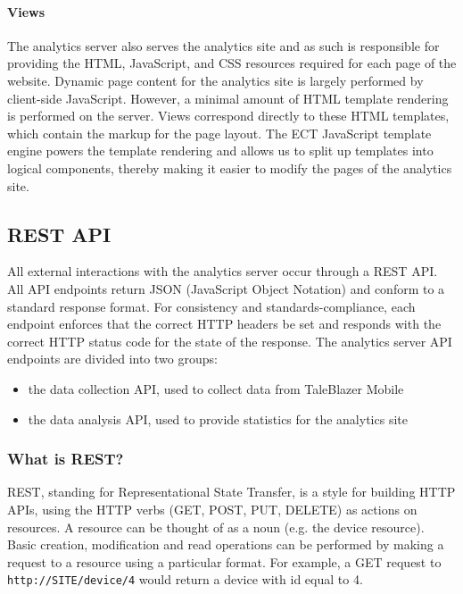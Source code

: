 \paragraph{Views}

The analytics server also serves the analytics site and as such is responsible for providing the HTML, JavaScript, and CSS resources required for each page of the website. Dynamic page content for the analytics site is largely performed by client-side JavaScript. However, a minimal amount of HTML template rendering is performed on the server. Views correspond directly to these HTML templates, which contain the markup for the page layout. The ECT JavaScript template engine powers the template rendering and allows us to split up templates into logical components, thereby making it easier to modify the pages of the analytics site.


\subsection{REST API}

All external interactions with the analytics server occur through a REST API. All API endpoints return JSON (JavaScript Object Notation) and conform to a standard response format. For consistency and standards-compliance, each endpoint enforces that the correct HTTP headers be set and responds with the correct HTTP status code for the state of the response. The analytics server API endpoints are divided into two groups:
	\begin{itemize}
		\item the data collection API, used to collect data from TaleBlazer Mobile
		\item the data analysis API, used to provide statistics for the analytics site
	\end{itemize}


\subsubsection{What is REST?}
REST, standing for Representational State Transfer, is a style for building HTTP APIs, using the HTTP verbs (GET, POST, PUT, DELETE) as actions on resources. \cite{site:rest} A resource can be thought of as a noun (e.g. the device resource). Basic creation, modification and read operations can be performed by making a request to a resource using a particular format. For example, a GET request to \texttt{http://SITE/device/4} would return a device with id equal to 4. 

